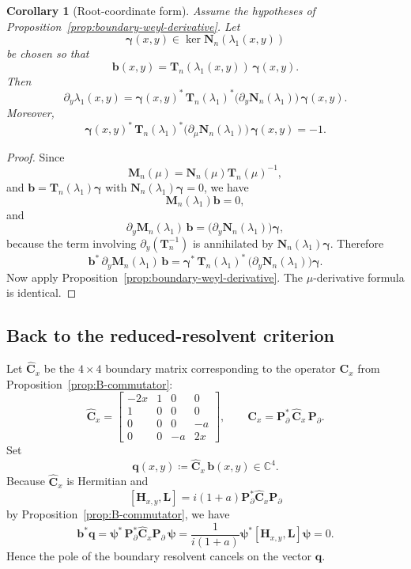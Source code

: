 \documentclass[11pt]{article}
\newtheorem{corollary}[theorem]{Corollary}
\begin{document}
\begin{corollary}[Root-coordinate form]\label{cor:root-coordinate-derivative}
Assume the hypotheses of Proposition~\ref{prop:boundary-weyl-derivative}. Let
\[
\boldsymbol{\gamma}(x,y)\in\ker \mathbf N_n(\lambda_1(x,y))
\]
be chosen so that
\[
\mathbf b(x,y)=\mathbf T_n(\lambda_1(x,y))\,\boldsymbol{\gamma}(x,y).
\]
Then
\[
\boxed{
\partial_y\lambda_1(x,y)
=
\boldsymbol{\gamma}(x,y)^*\,\mathbf T_n(\lambda_1)^*
\bigl(\partial_y \mathbf N_n(\lambda_1)\bigr)\,
\boldsymbol{\gamma}(x,y).
}
\]
Moreover,
\[
\boxed{
\boldsymbol{\gamma}(x,y)^*\,\mathbf T_n(\lambda_1)^*
\bigl(\partial_\mu \mathbf N_n(\lambda_1)\bigr)\,
\boldsymbol{\gamma}(x,y)
=
-1.
}
\]
\end{corollary}

\begin{proof}
Since
\[
\mathbf M_n(\mu)=\mathbf N_n(\mu)\mathbf T_n(\mu)^{-1},
\]
and \(\mathbf b=\mathbf T_n(\lambda_1)\boldsymbol{\gamma}\) with \(\mathbf N_n(\lambda_1)\boldsymbol{\gamma}=0\), we have
\[
\mathbf M_n(\lambda_1)\mathbf b=0,
\]
and
\[
\partial_y\mathbf M_n(\lambda_1)\,\mathbf b
=
\bigl(\partial_y\mathbf N_n(\lambda_1)\bigr)\boldsymbol{\gamma},
\]
because the term involving \(\partial_y(\mathbf T_n^{-1})\) is annihilated by
\(\mathbf N_n(\lambda_1)\boldsymbol{\gamma}\). Therefore
\[
\mathbf b^*\,\partial_y\mathbf M_n(\lambda_1)\,\mathbf b
=
\boldsymbol{\gamma}^*\,\mathbf T_n(\lambda_1)^*\,
\bigl(\partial_y\mathbf N_n(\lambda_1)\bigr)\boldsymbol{\gamma}.
\]
Now apply Proposition~\ref{prop:boundary-weyl-derivative}. The \(\mu\)-derivative formula is identical.
\end{proof}

\subsection*{Back to the reduced-resolvent criterion}

Let \(\widehat{\mathbf C}_x\) be the \(4\times4\) boundary matrix corresponding to the operator \(\mathbf C_x\) from Proposition~\ref{prop:B-commutator}:
\[
\widehat{\mathbf C}_x=
\begin{bmatrix}
-2x&1&0&0\\
1&0&0&0\\
0&0&0&-a\\
0&0&-a&2x
\end{bmatrix},
\qquad
\mathbf C_x=\mathbf P_\partial^*\,\widehat{\mathbf C}_x\,\mathbf P_\partial.
\]
Set
\[
\mathbf q(x,y)\coloneqq \widehat{\mathbf C}_x\,\mathbf b(x,y)\in\mathbb C^4.
\]
Because \(\widehat{\mathbf C}_x\) is Hermitian and
\[
[\mathbf H_{x,y},\mathbf L]=i(1+a)\mathbf P_\partial^* \widehat{\mathbf C}_x \mathbf P_\partial
\]
by Proposition~\ref{prop:B-commutator}, we have
\[
\mathbf b^*\mathbf q
=
\boldsymbol{\psi}^*\,\mathbf P_\partial^* \widehat{\mathbf C}_x \mathbf P_\partial\,\boldsymbol{\psi}
=
\frac{1}{i(1+a)}\boldsymbol{\psi}^*[\mathbf H_{x,y},\mathbf L]\boldsymbol{\psi}
=0.
\]
Hence the pole of the boundary resolvent cancels on the vector \(\mathbf q\).
\end{document}
